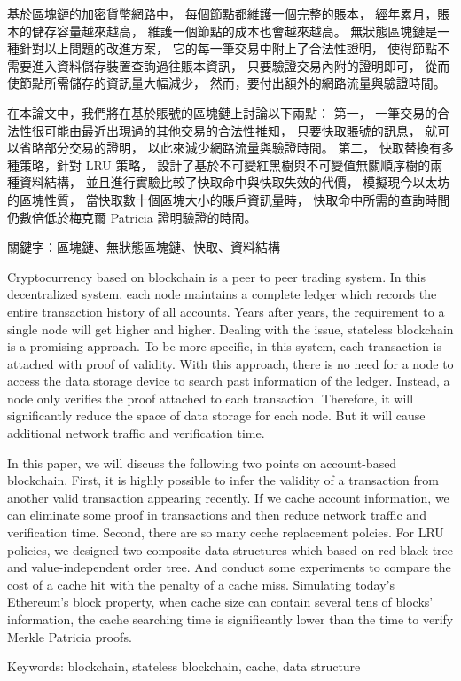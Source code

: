 \begin{abstractzh}
基於區塊鏈的加密貨幣網路中，
每個節點都維護一個完整的賬本，
經年累月，賬本的儲存容量越來越高，
維護一個節點的成本也會越來越高。
無狀態區塊鏈是一種針對以上問題的改進方案，
它的每一筆交易中附上了合法性證明，
使得節點不需要進入資料儲存裝置查詢過往賬本資訊，
只要驗證交易內附的證明即可，
從而使節點所需儲存的資訊量大幅減少，
然而，要付出額外的網路流量與驗證時間。

在本論文中，我們將在基於賬號的區塊鏈上討論以下兩點：
第一，
一筆交易的合法性很可能由最近出現過的其他交易的合法性推知，
只要快取賬號的訊息，
就可以省略部分交易的證明，
以此來減少網路流量與驗證時間。
第二，
快取替換有多種策略，針對 LRU 策略，
設計了基於不可變紅黑樹與不可變值無關順序樹的兩種資料結構，
並且進行實驗比較了快取命中與快取失效的代價，
模擬現今以太坊的區塊性質，
當快取數十個區塊大小的賬戶資訊量時，
快取命中所需的查詢時間仍數倍低於梅克爾 Patricia 證明驗證的時間。


\bigbreak
\noindent
關鍵字：區塊鏈、無狀態區塊鏈、快取、資料結構
\end{abstractzh}

\begin{abstracten}

Cryptocurrency based on blockchain is a peer to peer trading
system. In this decentralized system,
each node maintains a complete ledger which
records the entire transaction history of all accounts.
Years after years, the requirement to a single node will
get higher and higher. Dealing with the issue, stateless
blockchain is a promising approach. To be more specific,
in this system, each transaction is attached with proof
of validity. With this approach, there is no need for a node
to access the data storage device to search past information
of the ledger. Instead, a node only verifies the proof attached
to each transaction. Therefore, it will significantly
reduce the space of data storage for each node.
But it will cause additional network traffic and
verification time.

In this paper, we will discuss the following two points
on account-based blockchain.
First,
it is highly possible to infer the validity of
a transaction from another valid transaction appearing recently.
If we cache account information, we can eliminate some
proof in transactions and then reduce network traffic
and verification time.
Second,
there are so many ceche replacement polcies.
For LRU policies, we designed two composite data
structures which based on red-black tree and value-independent order tree.
And conduct some experiments to compare the cost of a
cache hit with the penalty of a cache miss.
Simulating today's Ethereum's block property,
when cache size can contain several tens of blocks' information,
the cache searching time is significantly lower than
the time to verify Merkle Patricia proofs.

\bigbreak
\noindent
Keywords: blockchain, stateless blockchain, cache, data structure
\end{abstracten}

